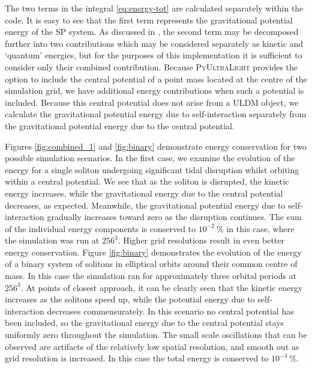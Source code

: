 \documentclass[a4paper,11pt]{article}
\newcommand{\PyUltraLight}{\textsc{PyUltraLight }}
\begin{document}
The two terms in the integral \ref{eq:energy-tot} are calculated separately within the code. It is easy to see that the first term represents the gravitational potential energy of the SP system. As discussed in \cite{Hui2016}, the second term may be decomposed further into two contributions which may be considered separately as kinetic and `quantum' energies, but for the purposes of this implementation it is sufficient to consider only their combined contribution. Because \PyUltraLight provides the option to include the central potential of a point mass located at the centre of the simulation grid, we have additional energy contributions when such a potential is included. Because this central potential does not arise from a ULDM object, we calculate the gravitational potential energy due to self-interaction separately from the gravitational potential energy due to the central potential.

Figures \ref{fig:combined_1} and \ref{fig:binary} demonstrate energy conservation for two possible simulation scenarios. In the first case, we examine the evolution of the energy for a single soliton undergoing significant tidal disruption whilst orbiting within a central potential. We see that as the soliton is disrupted, the kinetic energy increases, while the gravitational energy due to the central potential decreases, as expected. Meanwhile, the gravitational potential energy due to self-interaction gradually increases toward zero as the disruption continues. The sum of the individual energy components is conserved to $10^{-2}\ \%$ in this case, where the simulation was run at $256^3$. Higher grid resolutions result in even better energy conservation. Figure \ref{fig:binary} demonstrates the evolution of the energy of a binary system of solitons in elliptical orbits around their common centre of mass. In this case the simulation ran for approximately three orbital periods at $256^3$. At points of closest approach, it can be clearly seen that the kinetic energy increases as the solitons speed up, while the potential energy due to self-interaction decreases commensurately. In this scenario no central potential has been included, so the gravitational energy due to the central potential stays uniformly zero throughout the simulation. The small scale oscillations that can be observed are artifacts of the relatively low spatial resolution, and smooth out as grid resolution is increased. In this case the total energy is conserved to $10^{-3}\ \%$.
\end{document}
